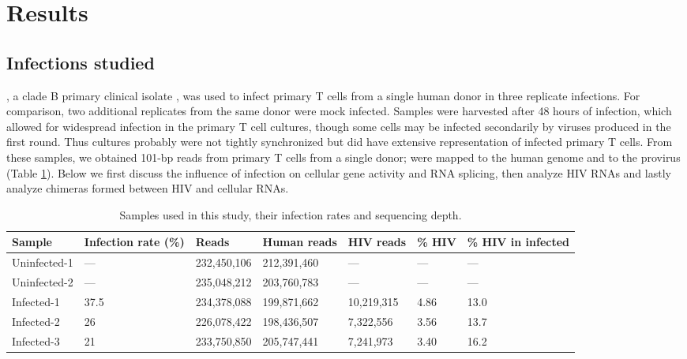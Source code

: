 \documentclass[../sherrill-Mix_thesis.tex]{subfiles}
\begin{document}
\section{Results}
	\subsection{Infections studied}
		\hivEight{}, a clade B primary clinical isolate \citep{Collman1992}, was used to infect primary \cdFour{} T cells from a single human donor in three replicate infections. For comparison, two additional replicates from the same donor were mock infected. Samples were harvested after 48 hours of infection, which allowed for widespread infection in the primary T cell cultures, though some cells may be infected secondarily by viruses produced in the first round.  Thus cultures probably were not tightly synchronized but did have extensive representation of infected primary T cells. From these samples, we obtained \nReads{} 101-bp reads from primary \cdFour{} T cells from a single donor; \nHuman{} were mapped to the human genome and \nHIV{} to the \hivEight{} provirus (Table \ref{tabSamples}). Below we first discuss the influence of infection on cellular gene activity and RNA splicing, then analyze HIV RNAs and lastly analyze chimeras formed between HIV and cellular RNAs.

		\begin{table}
			\begin{tabular}{|l|l|l|l|l|l|l|}
				\hline
				Sample       & Infection rate (\%) & Reads       & Human reads & HIV reads  & \% HIV & \% HIV in infected \\ 
				\hline
				Uninfected-1 & ---                 & 232,450,106 & 212,391,460 & ---        & ---    & ---                \\ 
				Uninfected-2 & ---                 & 235,048,212 & 203,760,783 & ---        & ---    & ---                \\ 
				Infected-1   & 37.5                & 234,378,088 & 199,871,662 & 10,219,315 & 4.86   & 13.0               \\ 
				Infected-2   & 26                  & 226,078,422 & 198,436,507 & 7,322,556  & 3.56   & 13.7               \\ 
				Infected-3   & 21                  & 233,750,850 & 205,747,441 & 7,241,973  & 3.40   & 16.2               \\ 
				\hline
			\end{tabular}
			\caption[Samples and sequencing coverage.]{Samples used in this study, their infection rates and sequencing depth.}
			\label{tabSamples}
		\end{table}
\end{document}

